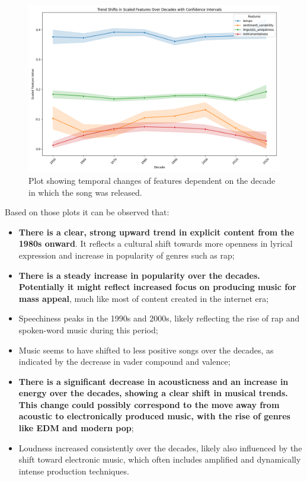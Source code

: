 \begin{center}
\begin{figure}[H]
  \centering
  \includegraphics[width=5in]{img/temporal_trends_3.png}
  \caption{Plot showing temporal changes of features dependent on the decade in
  which the song was released.}
  \label{Figure:fig_eh}
\end{figure}
\end{center}

Based on those plots it can be observed that:
\begin{itemize}
  \item \textbf{There is a clear, strong upward trend in explicit content from
    the 1980s onward}. It reflects a cultural shift  towards more openness in
    lyrical expression and increase in popularity of genres such as rap;
  \item \textbf{ There is a steady increase in popularity over the decades.
    Potentially it might reflect increased focus on  producing music for mass
  appeal}, much like most of content created in the internet era;
  \item Speechiness peaks in the 1990s and 2000s, likely reflecting the rise of
    rap and spoken-word music during this period;
  \item Music seems to have shifted to less  positive songs over the decades, as
    indicated by the decrease in vader compound and valence;
  \item \textbf{There is a significant decrease in acousticness and
      an increase in energy over the decades, showing a clear
      shift in musical trends. This change could possibly correspond to
      the move away from acoustic to electronically produced music, with the
      rise of genres like EDM and modern pop};
  \item Loudness increased consistently over the decades, likely also
    influenced by the shift toward electronic music, which often includes
    amplified and dynamically intense production techniques.
\end{itemize}
